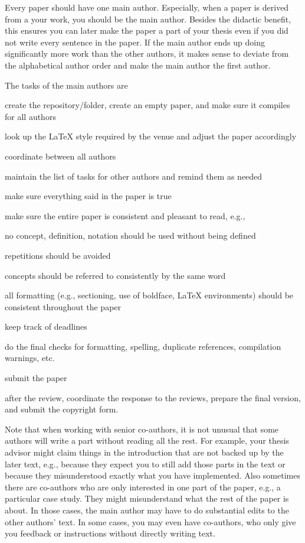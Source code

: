 \documentclass[12pt]{article}
\begin{document}
Every paper should have one main author.
Especially, when a paper is derived from a your work, you should be the main author.
Besides the didactic benefit, this ensures you can later make the paper a part of your thesis even if you did not write every sentence in the paper.
If the main author ends up doing significantly more work than the other authors, it makes sense to deviate from the alphabetical author order and make the main author the first author.

The tasks of the main authors are
\begin{compactitem}
\item create the repository/folder, create an empty paper, and make sure it compiles for all authors
\item look up the LaTeX style required by the venue and adjust the paper accordingly
\item coordinate between all authors
\item maintain the list of tasks for other authors and remind them as needed
\item make sure everything said in the paper is true
\item make sure the entire paper is consistent and pleasant to read, e.g.,
 \begin{compactitem}
  \item no concept, definition, notation should be used without being defined
  \item repetitions should be avoided
  \item concepts should be referred to consistently by the same word
  \item all formatting (e.g., sectioning, use of boldface, LaTeX environments) should be consistent throughout the paper
 \end{compactitem}
\item keep track of deadlines
\item do the final checks for formatting, spelling, duplicate references, compilation warnings, etc.
\item submit the paper
\item after the review, coordinate the response to the reviews, prepare the final version, and submit the copyright form.
\end{compactitem}

Note that when working with senior co-authors, it is not unusual that some authors will write a part without reading all the rest.
For example, your thesis advisor might claim things in the introduction that are not backed up by the later text, e.g., because they expect you to still add those parts in the text or because they misunderstood exactly what you have implemented.
Also sometimes there are co-authors who are only interested in one part of the paper, e.g., a particular case study.
They might misunderstand what the rest of the paper is about.
In those cases, the main author may have to do substantial edits to the other authors' text.
In some cases, you may even have co-authors, who only give you feedback or instructions without directly writing text.
\end{document}
